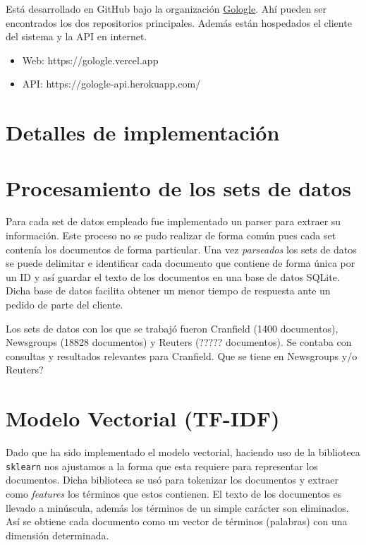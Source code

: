 \documentclass[12pt]{llncs}
\begin{document}
Está desarrollado en GitHub bajo la organización \href{https://github.com/Gologle}{\color{blue}Gologle}. Ahí pueden ser encontrados los dos repositorios principales. Además están hospedados el cliente del sistema y la API en internet.

\begin{itemize}
  \item Web: https://gologle.vercel.app
  \item API: https://gologle-api.herokuapp.com/
\end{itemize}

\section*{Detalles de implementación}

\section{Procesamiento de los sets de datos}

Para cada set de datos empleado fue implementado un parser para extraer su información. Este proceso no se pudo realizar de forma común pues cada set contenía los documentos de forma particular. Una vez \textit{parseados} los sets de datos se puede delimitar e identificar cada documento que contiene de forma única por un ID y así guardar el texto de los documentos en una base de datos SQLite. Dicha base de datos facilita obtener un menor tiempo de respuesta ante un pedido de parte del cliente.

Los sets de datos con los que se trabajó fueron Cranfield (1400 documentos), Newsgroups (18828 documentos) y Reuters (????? documentos). Se contaba con consultas y resultados relevantes para Cranfield. {\color{red}Que se tiene en Newsgroups y/o Reuters?}

\section{Modelo Vectorial (TF-IDF)}

Dado que ha sido implementado el modelo vectorial, haciendo uso de la biblioteca \verb+sklearn+ nos ajustamos a la forma que esta requiere para representar los documentos. Dicha biblioteca se usó para tokenizar los documentos y extraer como \textit{features} los términos que estos contienen. El texto de los documentos es llevado a minúscula, además los términos de un simple carácter son eliminados. Así se obtiene cada documento como un vector de términos (palabras) con una dimensión determinada.
\end{document}

